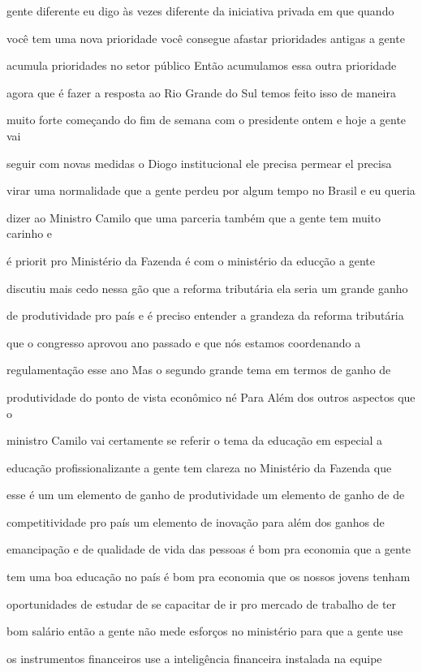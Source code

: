 \documentclass[a4paper,12pt]{article}
\begin{document}
gente diferente eu digo às vezes diferente da iniciativa privada em que quando

você tem uma nova prioridade você consegue afastar prioridades antigas a gente

acumula prioridades no setor público Então acumulamos essa outra prioridade

agora que é fazer a resposta ao Rio Grande do Sul temos feito isso de maneira

muito forte começando do fim de semana com o presidente ontem e hoje a gente vai

seguir com novas medidas o Diogo institucional ele precisa permear el precisa

virar uma normalidade que a gente perdeu por algum tempo no Brasil e eu queria

dizer ao Ministro Camilo que uma parceria também que a gente tem muito carinho e

é priorit pro Ministério da Fazenda é com o ministério da educção a gente

discutiu mais cedo nessa gão que a reforma tributária ela seria um grande ganho

de produtividade pro país e é preciso entender a grandeza da reforma tributária

que o congresso aprovou ano passado e que nós estamos coordenando a

regulamentação esse ano Mas o segundo grande tema em termos de ganho de

produtividade do ponto de vista econômico né Para Além dos outros aspectos que o

ministro Camilo vai certamente se referir o tema da educação em especial a

educação profissionalizante a gente tem clareza no Ministério da Fazenda que

esse é um um elemento de ganho de produtividade um elemento de ganho de de

competitividade pro país um elemento de inovação para além dos ganhos de

emancipação e de qualidade de vida das pessoas é bom pra economia que a gente

tem uma boa educação no país é bom pra economia que os nossos jovens tenham

oportunidades de estudar de se capacitar de ir pro mercado de trabalho de ter

bom salário então a gente não mede esforços no ministério para que a gente use

os instrumentos financeiros use a inteligência financeira instalada na equipe
\end{document}
